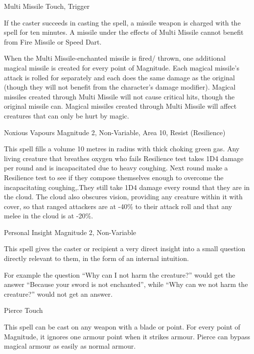 \begin{rpg-spell}
{Multi Missile}
{Touch, Trigger}

If the caster succeeds in casting the spell, a missile weapon is charged with the spell for ten minutes. A missile under the effects of Multi Missile cannot benefit from Fire Missile or Speed Dart. 

When the Multi Missile-enchanted missile is fired/ thrown, one additional magical missile is created for every point of Magnitude. Each magical missile’s attack is rolled for separately and each does the same damage as the original (though they will not benefit from the character’s damage modifier). Magical missiles created through Multi Missile will not cause critical hits, though the original missile can. Magical missiles created through Multi Missile will affect creatures that can only be hurt by magic. 
\end{rpg-spell}


\begin{rpg-spell}
{Noxious Vapours}
{Magnitude 2, Non-Variable, Area 10, Resist (Resilience)}

This spell fills a volume 10 metres in radius with thick choking green gas. Any living creature that breathes oxygen who fails Resilience test takes 1D4 damage per round and is incapacitated due to heavy coughing. Next round make a Resilience test to see if they compose themselves enough to overcome the incapacitating coughing,.They still take 1D4 damage every round that they are in the cloud. The cloud also obscures vision, providing any creature within it with cover, so that ranged attackers are at -40\% to their attack roll and that any melee in the cloud is at -20\%.
\end{rpg-spell}


\begin{rpg-spell}
{Personal Insight}
{Magnitude 2, Non-Variable}

This spell gives the caster or recipient a very direct insight into a small question directly relevant to them, in the form of an internal intuition.

For example the question “Why can I not harm the creature?” would get the answer “Because your sword is not enchanted”, while “Why can we not harm the creature?” would not get an answer.
\end{rpg-spell}


\begin{rpg-spell}
{Pierce}
{Touch}

This spell can be cast on any weapon with a blade or point. For every point of Magnitude, it ignores one armour point when it strikes armour. Pierce can bypass magical armour as easily as normal armour. 
\end{rpg-spell}


